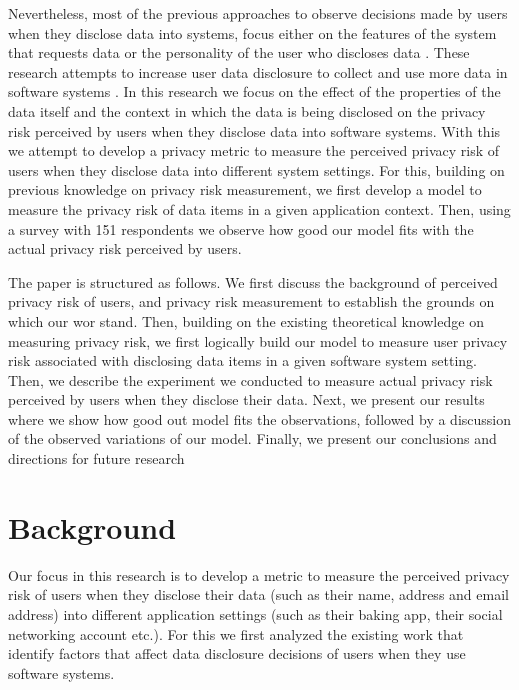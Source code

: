 \documentclass[conference]{IEEEtran}
\begin{document}
Nevertheless, most of the previous approaches to observe decisions made by users when they disclose data into systems, focus either on the features of the system that requests data \cite {li2010understanding, wang2016context, malheiros2013fairly} or the personality of the user who discloses data \cite {nissenbaum2009privacy}. These research attempts to increase user data disclosure to collect and use more data in software systems \cite {dennett2000little}. In this research we focus on the effect of the properties of the data itself and the context in which the data is being disclosed on the privacy risk perceived by users when they disclose data into software systems. With this we  attempt to develop a privacy metric to measure the perceived privacy risk of users when they disclose data into different system settings. For this, building on previous knowledge on privacy risk measurement, we first develop a model to measure the privacy risk of data items in a given application context. Then, using a survey with 151 respondents we observe how good our model fits with the actual privacy risk perceived by users.

The paper is structured as follows. We first discuss the background of perceived privacy risk of users, and privacy risk measurement to establish the grounds on which our wor stand. Then, building on the existing theoretical knowledge on measuring privacy risk, we first logically build our model to measure user privacy risk associated with disclosing data items in a given software system setting. Then, we describe the experiment we conducted to measure actual privacy risk perceived by users when they disclose their data. Next, we present our results where we show how good out model fits the observations, followed by a discussion of the observed variations of our model. Finally, we present our conclusions and directions for future research

\section {Background}

Our focus in this research is to develop a metric to measure the perceived privacy risk of users when they disclose their data (such as their name, address and email address) into different application settings (such as their baking app, their social networking account etc.). For this we first analyzed the existing work that identify factors that affect data disclosure decisions of users when they use software systems. 
\end{document}
